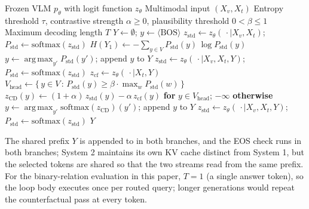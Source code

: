 \documentclass{ieeeaccess}
\begin{document}
\begin{algorithm}[!htb]
\caption{Entropy-Gated Contrastive Decoding (EGCD)}\label{alg:egcd}
\begin{algorithmic}[1]
\Require Frozen VLM $p_{\theta}$ with logit function $z_{\theta}$
\Require Multimodal input $(X_{v}, X_{t})$
\Require Entropy threshold $\tau$, contrastive strength $\alpha \geq 0$, plausibility threshold $0 < \beta \leq 1$
\Require Maximum decoding length $T$
\State $Y \leftarrow \emptyset$; \; $y \leftarrow \langle\text{BOS}\rangle$ 
\State $z_{\text{std}} \leftarrow z_{\theta}(\,\cdot \mid X_{v}, X_{t})$; \; $P_{\text{std}} \leftarrow \text{softmax}(z_{\text{std}})$ 
\State $H(Y_{1}) \leftarrow -\sum_{y \in V} P_{\text{std}}(y)\, \log P_{\text{std}}(y)$
 
    \State $y \leftarrow \operatorname*{arg\,max}_{y'} P_{\text{std}}(y')$; \; append $y$ to $Y$
     
      \State $z_{\text{std}} \leftarrow z_{\theta}(\,\cdot \mid X_{v}, X_{t}, Y)$; \; $P_{\text{std}} \leftarrow \text{softmax}(z_{\text{std}})$
    \EndIf
  \EndWhile
\Else {}
    \State $z_{\text{cf}} \leftarrow z_{\theta}(\,\cdot \mid X_{t}, Y)$ 
    \State $V_{\text{head}} \leftarrow \{\, y \in V \,:\, P_{\text{std}}(y) \geq \beta \cdot \max_{w} P_{\text{std}}(w)\,\}$
    \State $z_{\text{CD}}(y) \leftarrow (1 + \alpha)\, z_{\text{std}}(y) - \alpha\, z_{\text{cf}}(y)$ \textbf{for} $y \in V_{\text{head}}$; $-\infty$ \textbf{otherwise}
    \State $y \leftarrow \operatorname*{arg\,max}_{y'} \text{softmax}(z_{\text{CD}})(y')$; \; append $y$ to $Y$
      \State $z_{\text{std}} \leftarrow z_{\theta}(\,\cdot \mid X_{v}, X_{t}, Y)$; \; $P_{\text{std}} \leftarrow \text{softmax}(z_{\text{std}})$
    \EndIf
  \EndWhile
\EndIf
\State \Return $Y$
\end{algorithmic}
\end{algorithm}

The shared prefix $Y$ is appended to in both branches, and the EOS check runs in both branches; System 2 maintains its own KV cache distinct from System 1, but the selected tokens are shared so that the two streams read from the same prefix. For the binary-relation evaluation in this paper, $T = 1$ (a single answer token), so the loop body executes once per routed query; longer generations would repeat the counterfactual pass at every token.
\end{document}
